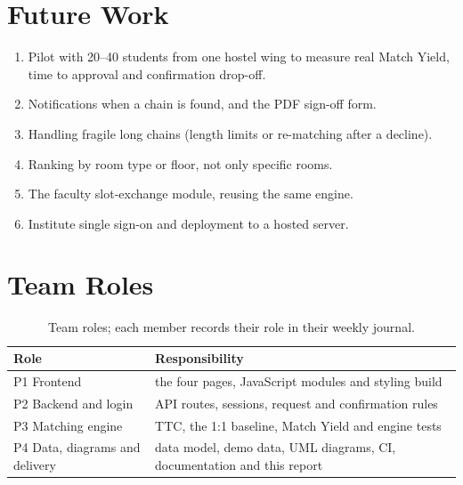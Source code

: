 \documentclass{tietreport}
\begin{document}
\section{Future Work}

\begin{enumerate}
  \item Pilot with 20--40 students from one hostel wing to measure real
    Match Yield, time to approval and confirmation drop-off.
  \item Notifications when a chain is found, and the PDF sign-off form.
  \item Handling fragile long chains (length limits or re-matching after
    a decline).
  \item Ranking by room type or floor, not only specific rooms.
  \item The faculty slot-exchange module, reusing the same engine.
  \item Institute single sign-on and deployment to a hosted server.
\end{enumerate}

\section{Team Roles}

\begin{table}[H]
\centering
\begin{tabularx}{\textwidth}{@{}lL@{}}
\toprule
\textbf{Role} & \textbf{Responsibility} \\
\midrule
P1 Frontend & the four pages, JavaScript modules and styling build \\
P2 Backend and login & API routes, sessions, request and confirmation rules \\
P3 Matching engine & TTC, the 1:1 baseline, Match Yield and engine tests \\
P4 Data, diagrams and delivery & data model, demo data, UML diagrams, CI, documentation and this report \\
\bottomrule
\end{tabularx}
\caption{Team roles; each member records their role in their weekly journal.}
\end{table}


\printbibliography[heading=bibintoc]
\end{document}
